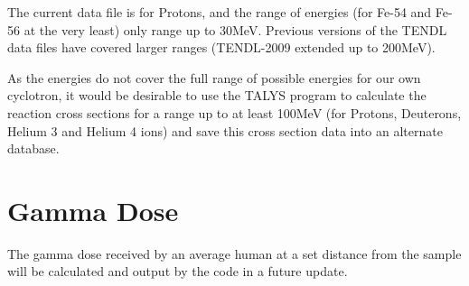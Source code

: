 \documentclass[12pt,twoside]{manual}
\begin{document}
The current data file is for Protons, and the range of energies (for Fe-54 and Fe-56 at the very least) only range up to 30MeV.  Previous versions of the TENDL data files have covered larger ranges (TENDL-2009 extended up to 200MeV).

As the energies do not cover the full range of possible energies for our own cyclotron, it would be desirable to use the TALYS program to calculate the reaction cross sections for a range up to at least 100MeV (for Protons, Deuterons, Helium 3 and Helium 4 ions) and save this cross section data into an alternate database.


\section{Gamma Dose}

The gamma dose received by an average human at a set distance from the sample will be calculated and output by the code in a future update.






\printbibliography
\end{document}

